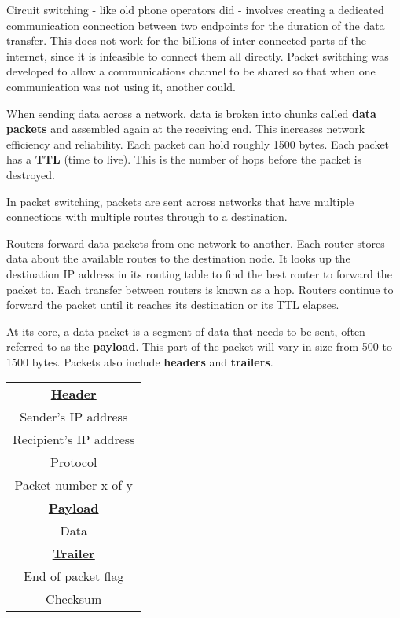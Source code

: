 \documentclass[../main.tex]{subfile}
\begin{document}


Circuit switching - like old phone operators did - involves creating a dedicated communication connection between two endpoints for the duration of the data transfer. This does not work for the billions of inter-connected parts of the internet, since it is infeasible to connect them all directly. Packet switching was developed to allow a communications channel to be shared so that when one communication was not using it, another could.

When sending data across a network, data is broken into chunks called \textbf{data packets} and assembled again at the receiving end. This increases network efficiency and reliability. Each packet can hold roughly 1500 bytes. Each packet has a \textbf{TTL} (time to live). This is the number of hops before the packet is destroyed.

In packet switching, packets are sent across networks that have multiple connections with multiple routes through to a destination.

Routers forward data packets from one network to another. Each router stores data about the available routes to the destination node. It looks up the destination IP address in its routing table to find the best router to forward the packet to. Each transfer between routers is known as a hop. Routers continue to forward the packet until it reaches its destination or its TTL elapses.

At its core, a data packet is a segment of data that needs to be sent, often referred to as the \textbf{payload}. This part of the packet will vary in size from 500 to 1500 bytes. Packets also include \textbf{headers} and \textbf{trailers}.

\begin{center}
\begin{tabular}{|c|}
	\hline
\textbf{\underline{Header}}\\
	Sender's IP address\\
	Recipient's IP address\\
	Protocol\\
	Packet number x of y\\
	\hline
	\textbf{\underline{Payload}}\\
	Data\\
	\hline
	\textbf{\underline{Trailer}}\\
	End of packet flag\\
	Checksum\\
	\hline
\end{tabular}
\end{center}
\end{document}
